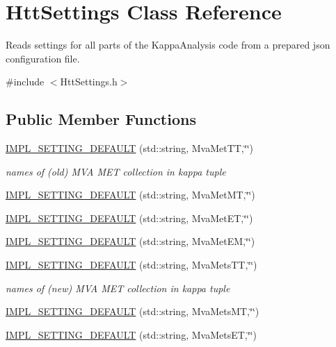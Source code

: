 \hypertarget{classHttSettings}{
\section{HttSettings Class Reference}
\label{classHttSettings}
}


Reads settings for all parts of the KappaAnalysis code from a prepared json configuration file.  


{\ttfamily \#include $<$HttSettings.h$>$}\subsection*{Public Member Functions}
\begin{DoxyCompactItemize}
\item 
\hyperlink{classHttSettings_ae668fb9a956228f73d235f0f6cdd345b}{IMPL\_\-SETTING\_\-DEFAULT} (std::string, MvaMetTT,\char`\"{}\char`\"{})
\begin{DoxyCompactList}\small\item\em names of (old) MVA MET collection in kappa tuple \item\end{DoxyCompactList}\item 
\hyperlink{classHttSettings_ad57514c4c90610ffa0dbfb7573adeed2}{IMPL\_\-SETTING\_\-DEFAULT} (std::string, MvaMetMT,\char`\"{}\char`\"{})
\item 
\hyperlink{classHttSettings_afb075e653510a1bf5abc085da9149091}{IMPL\_\-SETTING\_\-DEFAULT} (std::string, MvaMetET,\char`\"{}\char`\"{})
\item 
\hyperlink{classHttSettings_ac7c2fb6a9290e1fad8423b369af8d0d4}{IMPL\_\-SETTING\_\-DEFAULT} (std::string, MvaMetEM,\char`\"{}\char`\"{})
\item 
\hyperlink{classHttSettings_a384c503ac89815188770a2d62fd73e44}{IMPL\_\-SETTING\_\-DEFAULT} (std::string, MvaMetsTT,\char`\"{}\char`\"{})
\begin{DoxyCompactList}\small\item\em names of (new) MVA MET collection in kappa tuple \item\end{DoxyCompactList}\item 
\hyperlink{classHttSettings_a42c42494483c4ab580d8ad1b40094c25}{IMPL\_\-SETTING\_\-DEFAULT} (std::string, MvaMetsMT,\char`\"{}\char`\"{})
\item 
\hyperlink{classHttSettings_a3d01e1ff66021ed02442fe9fc5427181}{IMPL\_\-SETTING\_\-DEFAULT} (std::string, MvaMetsET,\char`\"{}\char`\"{})

\end{DoxyCompactItemize}
